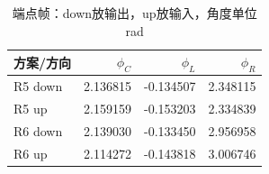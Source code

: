 \begin{table}[htbp]\centering\small
\caption{端点帧：down放输出，up放输入，角度单位rad}\label{tab:endpoint}
\begin{tabular}{@{}lrrr@{}}\toprule
方案/方向 & $\phi_C$ & $\phi_L$ & $\phi_R$\\\midrule
R5 down & 2.136815 & -0.134507 & 2.348115\\
R5 up & 2.159159 & -0.153203 & 2.334839\\
R6 down & 2.139030 & -0.133450 & 2.956958\\
R6 up & 2.114272 & -0.143818 & 3.006746\\
\bottomrule\end{tabular}\end{table}
